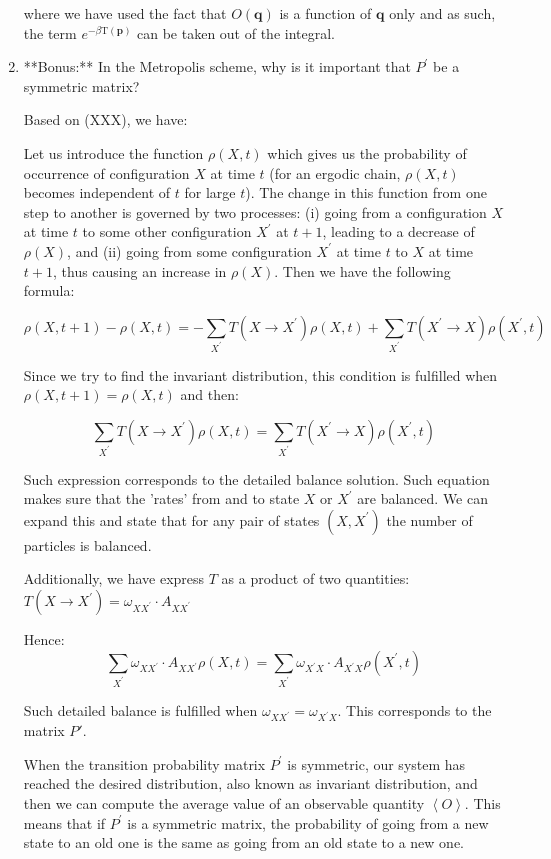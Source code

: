 \documentclass[12pt,letterpaper]{report}
\begin{document}
\begin{enumerate}
		where we have used the fact that $O(\mathbf{q}) $ is a function of $\mathbf{q}$ only and as such, the term $e^{-\beta \mathrm{T}(\mathbf{p} ) }$ can be taken out of the integral. 
		
		\item 
		**Bonus:** In the Metropolis scheme, why is it important that $P^\prime$ be a symmetric matrix?
				
		Based on (XXX), we have:
		
		Let us introduce the function $\rho (X, t)$ which gives us the probability of occurrence of configuration $X$ at time $t$ (for an ergodic chain, $\rho (X, t)$ becomes independent of $t$ for large $t$). The change in this function from one step to another is governed by two processes: (i) going from a configuration $X$ at time $t$ to some other configuration $X^\prime$ at $t + 1$, leading to a decrease of $\rho (X)$, and (ii) going from some configuration $X^\prime$ at time $t$ to $X$ at time $t + 1$, thus causing an increase in $\rho (X)$.	Then we have the following formula:
		
		$$
		\rho (X, t + 1) - \rho (X, t) = -\sum_{X^\prime}^{}T(X \rightarrow X^\prime )\rho (X, t) + 
		\sum_{X^\prime}^{}T(X^\prime \rightarrow X )\rho (X^\prime , t)		
		$$
		
		Since we try to find the invariant distribution, this condition is fulfilled when $\rho (X, t + 1) = \rho (X, t)$ and then:

		$$
		\sum_{X^\prime}^{}T(X \rightarrow X^\prime )\rho (X, t) = 
		\sum_{X^\prime}^{}T(X^\prime \rightarrow X )\rho (X^\prime , t)		
		$$
		
		Such expression corresponds to the detailed balance solution. Such equation makes sure that the 'rates' from and to state $X$ or $X^\prime$ are balanced. We can expand this and state that for any pair of states $(X, X^\prime)$ the number of particles is balanced. 
		
		Additionally, we have express $T$ as a product of two quantities:
		$T(X \rightarrow X^\prime ) = \omega_{XX^\prime} \cdot A_{XX^\prime}$
		
		Hence: 
		$$
		\sum_{X^\prime}^{} \omega_{XX^\prime} \cdot A_{XX^\prime}  \rho (X, t) = 
		\sum_{X^\prime}^{} \omega_{X^\prime X} \cdot A_{X^\prime X} \rho (X^\prime , t)		
		$$
		
		Such detailed balance is fulfilled when $\omega_{XX^\prime}=\omega_{X^\prime X}$. This corresponds to the matrix $P'$.
		
		When the transition probability matrix $P^\prime$ is symmetric, our system has reached the desired distribution, also known as invariant distribution, and then we can compute the average value of an observable quantity $\left<O\right>$. This means that if $P^\prime$ is a symmetric matrix, the probability of going from a new state to an old one is the same as going from an old state to a new one.
		
	\end{enumerate}
\end{document}
